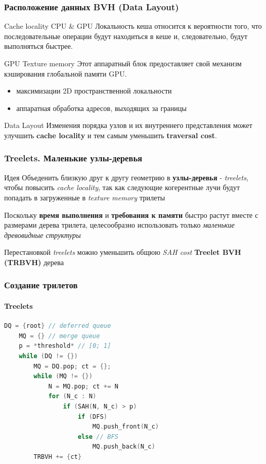 \documentclass{beamer}
\begin{document}
\begin{frame}
    \frametitle{Расположение данных BVH (Data Layout)}
    \begin{block}{Cache locality CPU \& GPU}
        Локальность кеша относится к вероятности того,
        что последовательные операции будут находиться в кеше и,
        следовательно, будут выполняться быстрее.
    \end{block}
    \begin{block}{GPU Texture memory}
        Этот аппаратный блок предоставляет свой механизм кэширования глобальной памяти GPU.
        \begin{itemize}
            \item
                максимизации 2D пространственной локальности
            \item
                аппаратная обработка адресов, выходящих за границы
        \end{itemize}
    \end{block}
    \begin{block}{Data Layout}
        Изменения порядка узлов и их внутреннего представления может улучшить \textbf{cache locality}
        и тем самым уменьшить \textbf{traversal cost}.
    \end{block}
\end{frame}

\begin{frame}[t]
    \frametitle{Treelets. Маленькие узлы-деревья}

    \begin{block}{Идея}
        Объеденить близкую друг к другу геометрию в \textbf{узлы-деревья} - \textit{treelets}, чтобы повысить
        \textit{cache locality}, так как следующие когерентные лучи будут попадать в загруженные в \textit{texture memory} трилеты
    \end{block}
    \begin{block}{}
        Поскольку \textbf{время выполнения} и \textbf{требования к памяти} быстро растут вместе с размерами дерева трилета,
        целесообразно использовать только \textit{маленькие древовидные структуры}
    \end{block}
    Перестановкой \textit{treelets} можно уменьшить общюю \textit{SAH cost} \textbf{Treelet BVH (TRBVH)} дерева
\end{frame}

\begin{frame}[fragile]
    \frametitle{Создание трилетов}
    \framesubtitle{Treelets}
    \begin{lstlisting}[language=C++,basicstyle=\ttfamily,keywordstyle=\color{blue}]
    DQ = {root} // deferred queue
    MQ = {} // merge queue
    p = *threshold* // [0; 1]
    while (DQ != {})
        MQ = DQ.pop; ct = {};
        while (MQ != {})
            N = MQ.pop; ct += N
            for (N_c : N)
                if (SAH(N, N_c) > p)
                    if (DFS)
                        MQ.push_front(N_c)
                    else // BFS
                        MQ.push_back(N_c)
        TRBVH += {ct}
    \end{lstlisting}
\end{frame}
\end{document}

